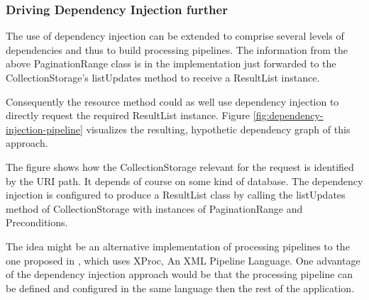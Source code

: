 \documentclass[11pt,a4paper,headsepline,twoside]{scrartcl}		%
\newcommand{\citeurl}[2]{\url{#1} (#2)}
\begin{document}


\subsubsection{Driving Dependency Injection further}

The use of dependency injection can be extended to comprise several levels of
dependencies and thus to build processing pipelines.  The information from the
above PaginationRange class is in the implementation just forwarded to the
CollectionStorage's listUpdates method to receive a ResultList instance.

Consequently the resource method could as well use dependency injection to
directly request the required ResultList
instance. Figure \ref{fig:dependency-injection-pipeline} visualizes the resulting,
hypothetic dependency graph of this approach.

The figure shows how the CollectionStorage relevant for the request is
identified by the URI path. It depends of course on some kind of database.  The
dependency injection is configured to produce a ResultList class by calling the
listUpdates method of CollectionStorage with instances of PaginationRange and
Preconditions.

The idea might be an alternative implementation of processing pipelines to the
one proposed in \cite{Davis:2011:XTR:1967428.1967437}, which uses XProc, An XML
Pipeline Language. One advantage of the dependency injection approach would be
that the processing pipeline can be defined and configured in the same language
then the rest of the application.
\end{document}

